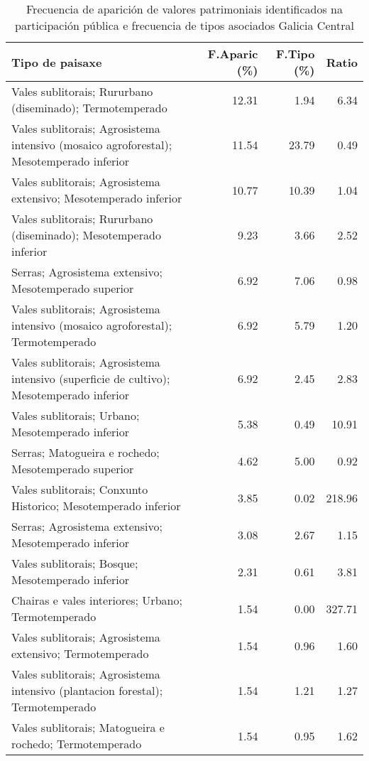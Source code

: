 \begin{table}[p]
\centering
\caption{Frecuencia de aparición de valores patrimoniais identificados na participación pública e frecuencia de tipos asociados Galicia Central} 
\label{vsixotpat7}
\begin{tabular}{lrrr}
  \hline
Tipo de paisaxe & F.Aparic (\%) & F.Tipo (\%) & Ratio \\ 
  \hline
Vales sublitorais; Rururbano (diseminado); Termotemperado & 12.31 & 1.94 & 6.34 \\ 
  Vales sublitorais; Agrosistema intensivo (mosaico agroforestal); Mesotemperado inferior & 11.54 & 23.79 & 0.49 \\ 
  Vales sublitorais; Agrosistema extensivo; Mesotemperado inferior & 10.77 & 10.39 & 1.04 \\ 
  Vales sublitorais; Rururbano (diseminado); Mesotemperado inferior & 9.23 & 3.66 & 2.52 \\ 
  Serras; Agrosistema extensivo; Mesotemperado superior & 6.92 & 7.06 & 0.98 \\ 
  Vales sublitorais; Agrosistema intensivo (mosaico agroforestal); Termotemperado & 6.92 & 5.79 & 1.20 \\ 
  Vales sublitorais; Agrosistema intensivo (superficie de cultivo); Mesotemperado inferior & 6.92 & 2.45 & 2.83 \\ 
  Vales sublitorais; Urbano; Mesotemperado inferior & 5.38 & 0.49 & 10.91 \\ 
  Serras; Matogueira e rochedo; Mesotemperado superior & 4.62 & 5.00 & 0.92 \\ 
  Vales sublitorais; Conxunto Historico; Mesotemperado inferior & 3.85 & 0.02 & 218.96 \\ 
  Serras; Agrosistema extensivo; Mesotemperado inferior & 3.08 & 2.67 & 1.15 \\ 
  Vales sublitorais; Bosque; Mesotemperado inferior & 2.31 & 0.61 & 3.81 \\ 
  Chairas e vales interiores; Urbano; Termotemperado & 1.54 & 0.00 & 327.71 \\ 
  Vales sublitorais; Agrosistema extensivo; Termotemperado & 1.54 & 0.96 & 1.60 \\ 
  Vales sublitorais; Agrosistema intensivo (plantacion forestal); Termotemperado & 1.54 & 1.21 & 1.27 \\ 
  Vales sublitorais; Matogueira e rochedo; Termotemperado & 1.54 & 0.95 & 1.62 \\ 
   \hline
\end{tabular}
\end{table}
